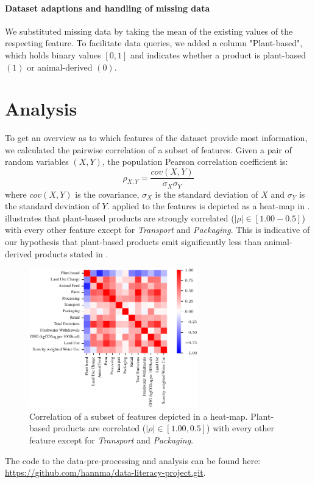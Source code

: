 \documentclass{article}
\begin{document}
\paragraph{Dataset adaptions and handling of missing data}

We substituted  missing  data by taking the mean of the existing values of the respecting feature. To facilitate data queries, we added a column "Plant-based", which holds binary values $[0,1]$ and indicates whether a product is plant-based $(1)$ or animal-derived $(0)$.


\section{Analysis}
\label{analysis}

To get an overview as to which features of the dataset provide most information, we calculated the pairwise correlation of a subset of features. Given a pair of random variables $(X,Y)$, the population Pearson correlation coefficient is: 
\begin{equation} \label{eq:corr}
  \rho_{X,Y} = \frac{cov(X,Y)}{\sigma_X \sigma_Y}
\end{equation}
where $cov(X,Y)$ is the covariance, $\sigma_X$ is the standard deviation of $X$ and $\sigma_Y$ is the standard deviation of $Y$.
 applied to the features is depicted  as a heat-map in  .   illustrates that
plant-based products are strongly correlated ($|\rho| \in [1.00 - 0.5]$) with every other feature except for \textit{Transport} and \textit{Packaging}. This is indicative of our hypothesis that plant-based products emit significantly less than animal-derived products stated in  .


\begin{figure}[h]
  \centering
  \includegraphics[width=0.65\textwidth]{figures/heat-map.pdf}
  \caption{Correlation of a subset of features depicted in a heat-map. Plant-based products are  correlated ($|\rho| \in [1.00, 0.5]$) with every other feature except for \textit{Transport} and \textit{Packaging}.}
  \label{fig:corr}
\end{figure}
The code to the data-pre-processing and analysis can be found here: \url{https://github.com/hannma/data-literacy-project.git}.
\end{document}
